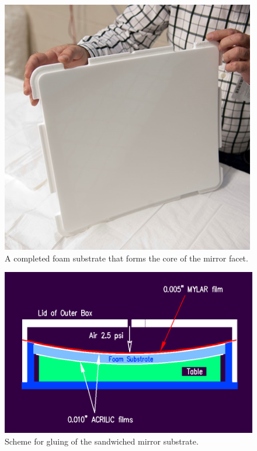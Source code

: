 \begin{figure}[ht]
    \centering
    \includegraphics[width=0.9\linewidth]{images/Foam_Sub.png}
    \caption{A completed foam substrate that forms the core of the mirror facet.}
    \label{fig:Foam_Sub}
\end{figure}

\begin{figure}[ht]
    \centering
    \includegraphics[width=0.9\linewidth]{images/Gluing_Sandwich_New.png}
    \caption{Scheme for gluing of the sandwiched mirror substrate.}
    \label{fig:Gluing_Sandwich}
\end{figure}
 
